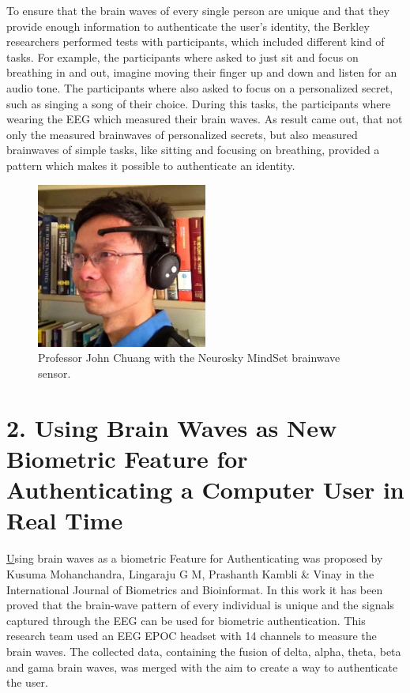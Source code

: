 \documentclass[a4paper,11pt]{article}
\begin{document}
To ensure that the brain waves of every single person are unique and that they provide enough information to authenticate the user's identity, the Berkley researchers performed tests with participants, which included different kind of tasks. For example, the participants where asked to just sit and focus on breathing in and out, imagine moving their finger up and down and listen for an audio tone. The participants where also asked to focus on a personalized secret, such as singing a song of their choice. During this tasks, the participants where wearing the EEG which measured their brain waves. As result came out, that not only the measured brainwaves of personalized secrets, but also measured brainwaves of simple tasks, like sitting and focusing on breathing, provided a pattern which makes it possible to authenticate an identity.
\begin{figure}[H]
	\centering
    \includegraphics[width=0.5\textwidth]{john_chuang}
    \caption{Professor John Chuang with the Neurosky MindSet brainwave sensor.}
\end{figure}
\chapter{2. Using Brain Waves as New Biometric Feature for Authenticating a Computer User in Real Time}
\href{http://www.cscjournals.org/manuscript/Journals/IJBB/volume7/Issue1/IJBB-211.pdf}
Using brain waves as a biometric Feature for Authenticating was proposed by Kusuma Mohanchandra, Lingaraju G M, Prashanth Kambli \& Vinay in the International Journal of Biometrics and Bioinformat. In this work it has been proved that the brain-wave pattern of every individual is  unique and the signals captured through the  EEG can be used for biometric authentication. This research team used an EEG EPOC headset with 14 channels to measure the brain waves. The collected data, containing the fusion of delta, alpha, theta, beta and gama brain waves, was merged with the aim to create a way to authenticate the user.
\end{document}
